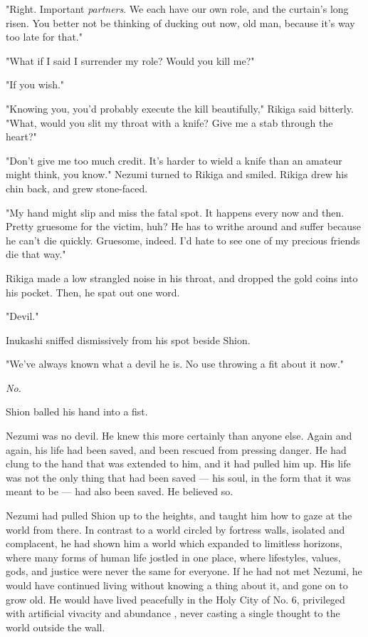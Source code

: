 "Right. Important \emph{partners}. We each have our own role, and the curtain's
long risen. You better not be thinking of ducking out now, old man,
because it's way too late for that."

"What if I said I surrender my role? Would you kill me?"

"If you wish."

"Knowing you, you'd probably execute the kill beautifully," Rikiga said
bitterly. "What, would you slit my throat with a knife? Give me a stab
through the heart?"

"Don't give me too much credit. It's harder to wield a knife than an
amateur might think, you know." Nezumi turned to Rikiga and smiled.
Rikiga drew his chin back, and grew stone-faced.

"My hand might slip and miss the fatal spot. It happens every now and
then. Pretty gruesome for the victim, huh? He has to writhe around and
suffer because he can't die quickly. Gruesome, indeed. I'd hate to see
one of my precious friends die that way."

Rikiga made a low strangled noise in his throat, and dropped the gold
coins into his pocket. Then, he spat out one word.

"Devil."

Inukashi sniffed dismissively from his spot beside Shion.

"We've always known what a devil he is. No use throwing a fit about it
now."

\emph{No.}

Shion balled his hand into a fist.

Nezumi was no devil. He knew this more certainly than anyone else. Again
and again, his life had been saved, and been rescued from pressing
danger. He had clung to the hand that was extended to him, and it had
pulled him up. His life was not the only thing that had been saved --- his
soul, in the form that it was meant to be --- had also been saved. He
believed so.

Nezumi had pulled Shion up to the heights, and taught him how to gaze at
the world from there. In contrast to a world circled by fortress walls,
isolated and complacent, he had shown him a world which expanded to
limitless horizons, where many forms of human life jostled in one place,
where lifestyles, values, gods, and justice were never the same for
everyone. If he had not met Nezumi, he would have continued living
without knowing a thing about it, and gone on to grow old. He would have
lived peacefully in the Holy City of No. 6, privileged with artificial
vivacity and abundance , never casting a single thought to the world
outside the wall.


